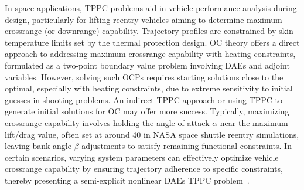 In space applications, \ac{TPPC} problems aid in vehicle performance analysis during design, particularly for lifting reentry vehicles aiming to determine maximum crossrange (or downrange) capability. Trajectory profiles are constrained by skin temperature limits set by the thermal protection design. \ac{OC} theory offers a direct approach to addressing maximum crossrange capability with heating constraints, formulated as a two-point boundary value problem involving \acp{DAE} and adjoint variables. However, solving such \acp{OCP} requires starting solutions close to the optimal, especially with heating constraints, due to extreme sensitivity to initial guesses in shooting problems. An indirect \ac{TPPC} approach or using \ac{TPPC} to generate initial solutions for \ac{OC} may offer more success. Typically, maximizing crossrange capability involves holding the angle of attack $\alpha$ near the maximum lift/drag value, often set at around \SI{40}{\deg} in \ac{NASA} space shuttle reentry simulations, leaving bank angle $\beta$ adjustments to satisfy remaining functional constraints. In certain scenarios, varying system parameters can effectively optimize vehicle crossrange capability by ensuring trajectory adherence to specific constraints, thereby presenting a semi-explicit nonlinear \acp{DAE} \ac{TPPC} problem~\cite{brenan1986numerical, brenan1995numerical}.

